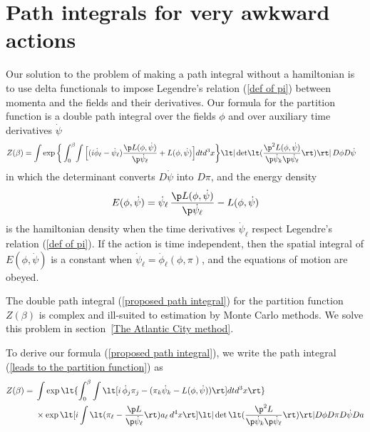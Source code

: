 \documentclass[prd,preprint,floatfix,showpacs]{revtex4-1}
\begin{document}
\section {Path integrals for very awkward actions
\label {Path integrals for very awkward actions} }

\par
Our solution to the problem
of making a path integral without a
hamiltonian is to use
delta functionals to
impose Legendre's relation (\ref {def of pi})
between momenta and 
the fields and their derivatives.
Our formula for the partition function 
is a double path integral over the fields \( \phi \)
and over auxiliary time derivatives \( \dot \psi \)
\begin{equation}
   \begin{split}
Z(\beta) = {}&
\! \int \exp \bigg\{ \int_0^\beta \! \int 
\Big[ ( i \dot \phi_\ell
- \dot \psi_\ell ) \frac{ \p  L(\phi, \dot \psi) }
{ \p \dot \psi_\ell }
+ L(\phi, \dot \psi) 
\Big] dt d^3x \bigg\}  \lt| \det \! 
\lt( \frac{ \p^2  L(\phi, \dot \psi) }
{ \p \dot \psi_k \p \dot \psi_\ell }  \rt) \rt|
\, D\phi D\dot\psi 
\label {proposed path integral}
   \end{split}
\end{equation}
in which the determinant converts 
\( D\dot \psi \) into \( D\pi \),
and the energy density
\begin{equation}
E(\phi, \dot \psi) = {}
\dot \psi_\ell \, \frac{ \p  L(\phi, \dot \psi) }
{ \p \dot \psi_\ell }
- L(\phi, \dot \psi) 
\label {pseudo-hamiltonian}
\end{equation}
is the hamiltonian density when
the time derivatives
\( \dot \psi_\ell  \) 
respect Legendre's relation (\ref {def of pi})\@.
If the action is time independent, then
the spatial integral of \( E(\phi, \dot \psi) \)
is a constant when 
\( \dot \psi_\ell = \dot \phi_\ell (\phi, \pi) \), and
the equations of motion are obeyed.
\par
The double path integral (\ref {proposed path integral})
for the partition function \( Z(\beta) \) is 
complex and ill-suited to estimation
by Monte Carlo methods.
We solve this problem in 
section~\ref {The Atlantic City method}\@.
\par
To derive our formula (\ref {proposed path integral}),
we write the path integral 
(\ref {leads to the partition function}) as
\begin{equation}
   \begin{split}
Z(\beta) = {}&
\int \exp \lt\{ \int_0^\beta \int \lt[ i \, \dot \phi_j \pi_j 
- ( \pi_k \dot \psi_k - L(\phi, \dot \psi) )
\rt] dt d^3x \rt\} \\
{}& \times \exp \lt[ i \int \lt( \pi_\ell 
- \frac{ \p  L }{ \p \dot \psi_\ell } \rt)
a_\ell \, d^4x \rt] 
\lt| \det \lt( \frac{ \p^2  L }
 { \p \dot \psi_k \p \dot \psi_\ell }  \rt) \rt| 
D\phi D\pi D\dot\psi Da 
\label {quartic path integral}
   \end{split}
\end{equation}
\end{document}
